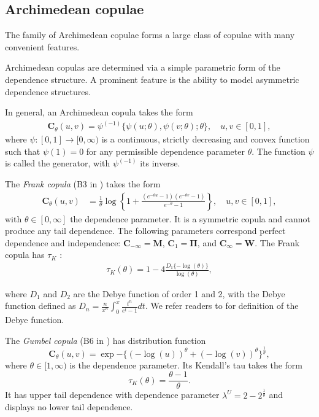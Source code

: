 \documentclass[11pt,a4paper,english]{article}
\begin{document}
\subsection{Archimedean copulae}\label{sec:archimedean-copula}
The family of Archimedean copulae forms a large class of copulae with
many convenient features.

Archimedean copulas are determined via a simple parametric form of the
dependence structure. A prominent feature is the ability to model
asymmetric dependence structures.  

In general, an Archimedean copula takes the form
\begin{align*}
  \bm{C}_\theta(u,v) = \psi^{(-1)}\{\psi(u; \theta), \psi(v; \theta); \theta\},\quad u,v\in [0,1],
    \end{align*}
where $\psi:[0,1] \rightarrow [0,\infty)$ is a continuous, strictly
decreasing and convex function such that $\psi(1)=0$ for any
permissible dependence parameter $\theta$. The function $\psi$ is 
called the generator, with $\psi^{(-1)}$ its inverse.

The {\em Frank copula\/} (B3 in \citet{joe1997multivariate}) takes the form
\begin{align*}
    \bm{C}_{\theta}(u,v) &= \frac{1}{\theta}
    \log \left\{
    1 + \frac{(e^{-\theta u}-1)(e^{-\theta v}-1)}{e^{-\theta}-1}
    \right\}, \quad u,v\in [0,1],
    \end{align*}
    with $\theta \in [0, \infty]$ the dependence parameter. 
    It is a symmetric copula and cannot produce any tail
    dependence. The following parameters correspond perfect dependence
    and independence: $\bm{C}_{-\infty} = \bm{M}$, $\bm{C}_1 = \bm{\Pi}$,
    and $\bm{C}_\infty = \bm{W}$. 
    The Frank copula has $\tau_K$ :
\begin{align*}
    \tau_K(\theta) = 1-4\frac{D_1\{-\log(\theta)\}}{\log(\theta)},
    \end{align*}

where $D_1$ and $D_2$ are the Debye function of order 1 and 2, with
the Debye function defined as $D_n =
\frac{n}{x^n}\int_0^x\frac{t^n}{e^t-1}dt$.
We refer readers to \citet[p.998]{abramowitz1972handbook} for definition of the Debye function. 

The {\em Gumbel copula\/} (B6 in \citet{joe1997multivariate}) has
distribution function
\begin{equation*}
  \bm{C}_{\theta}(u,v) = \exp{-\{ (-\log(u))^\theta +(-\log(v))^\theta 
    \}^{\frac{1}{\theta}}},
\end{equation*}
where $\theta \in [1,\infty)$ is the dependence parameter.
Its  Kendall's tau takes the form \begin{equation*}
  \tau_K(\theta) =\frac{\theta-1}{\theta}. 
 \end{equation*}
It has upper tail dependence with dependence parameter $\lambda^U
= 2-2^{\frac{1}{\theta}}$ and displays no lower tail dependence. 
    
\end{document}
